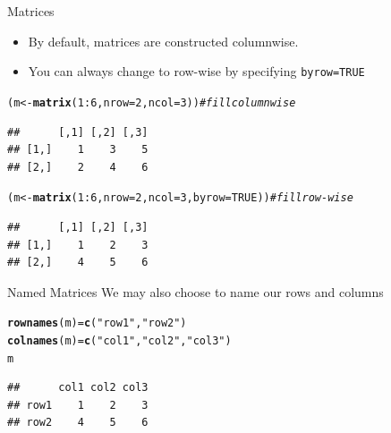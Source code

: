 \documentclass[xcolor=svgnames, 10pt]{beamer}
\makeatletter
\newcommand{\hlnum}[1]{\textcolor[rgb]{0.686,0.059,0.569}{#1}}%
\newcommand{\hlstr}[1]{\textcolor[rgb]{0.192,0.494,0.8}{#1}}%
\newcommand{\hlcom}[1]{\textcolor[rgb]{0.678,0.584,0.686}{\textit{#1}}}%
\newcommand{\hlopt}[1]{\textcolor[rgb]{0,0,0}{#1}}%
\newcommand{\hlstd}[1]{\textcolor[rgb]{0.345,0.345,0.345}{#1}}%
\newcommand{\hlkwb}[1]{\textcolor[rgb]{0.69,0.353,0.396}{#1}}%
\newcommand{\hlkwc}[1]{\textcolor[rgb]{0.333,0.667,0.333}{#1}}%
\newcommand{\hlkwd}[1]{\textcolor[rgb]{0.737,0.353,0.396}{\textbf{#1}}}%
\newenvironment{kframe}{%
 \def\at@end@of@kframe{}%
 \ifinner\ifhmode%
  \def\at@end@of@kframe{\end{minipage}}%
  \begin{minipage}{\columnwidth}%
 \fi\fi%
 \def\FrameCommand##1{\hskip\@totalleftmargin \hskip-\fboxsep
 \colorbox{shadecolor}{##1}\hskip-\fboxsep
     \hskip-\linewidth \hskip-\@totalleftmargin \hskip\columnwidth}%
 \MakeFramed {\advance\hsize-\width
   \@totalleftmargin\z@ \linewidth\hsize
   \@setminipage}}%
 {\par\unskip\endMakeFramed%
 \at@end@of@kframe}
\newenvironment{knitrout}{}{} %
\makeatother
\begin{document}
\begin{frame}[fragile]{Matrices}
\begin{itemize}
\item By default, matrices are constructed columnwise.  
\item You can always change to row-wise by specifying {\tt byrow=TRUE}
\end{itemize}
\begin{knitrout}\footnotesize
{}\color{fgcolor}\begin{kframe}
\begin{alltt}
\hlstd{(m} \hlkwb{<-} \hlkwd{matrix}\hlstd{(}\hlnum{1}\hlopt{:}\hlnum{6}\hlstd{,} \hlkwc{nrow}\hlstd{=}\hlnum{2}\hlstd{,} \hlkwc{ncol} \hlstd{=}\hlnum{3}\hlstd{))} \hlcom{# fill columnwise}
\end{alltt}
\begin{verbatim}
##      [,1] [,2] [,3]
## [1,]    1    3    5
## [2,]    2    4    6
\end{verbatim}
\begin{alltt}
\hlstd{(m} \hlkwb{<-} \hlkwd{matrix}\hlstd{(}\hlnum{1}\hlopt{:}\hlnum{6}\hlstd{,} \hlkwc{nrow}\hlstd{=}\hlnum{2}\hlstd{,} \hlkwc{ncol} \hlstd{=}\hlnum{3}\hlstd{,} \hlkwc{byrow}\hlstd{=}\hlnum{TRUE}\hlstd{))} \hlcom{#fill row-wise}
\end{alltt}
\begin{verbatim}
##      [,1] [,2] [,3]
## [1,]    1    2    3
## [2,]    4    5    6
\end{verbatim}
\end{kframe}
\end{knitrout}
\end{frame}


\begin{frame}[fragile]{Named Matrices}
We may also choose to name our rows and columns
\begin{knitrout}\footnotesize
{}\color{fgcolor}\begin{kframe}
\begin{alltt}
\hlkwd{rownames}\hlstd{(m)} \hlkwb{=} \hlkwd{c}\hlstd{(}\hlstr{"row1"}\hlstd{,} \hlstr{"row2"}\hlstd{)}
\hlkwd{colnames}\hlstd{(m)} \hlkwb{=} \hlkwd{c}\hlstd{(}\hlstr{"col1"}\hlstd{,} \hlstr{"col2"}\hlstd{,} \hlstr{"col3"}\hlstd{)}
\hlstd{m}
\end{alltt}
\begin{verbatim}
##      col1 col2 col3
## row1    1    2    3
## row2    4    5    6
\end{verbatim}
\end{kframe}
\end{knitrout}
\end{frame}
\end{document}
